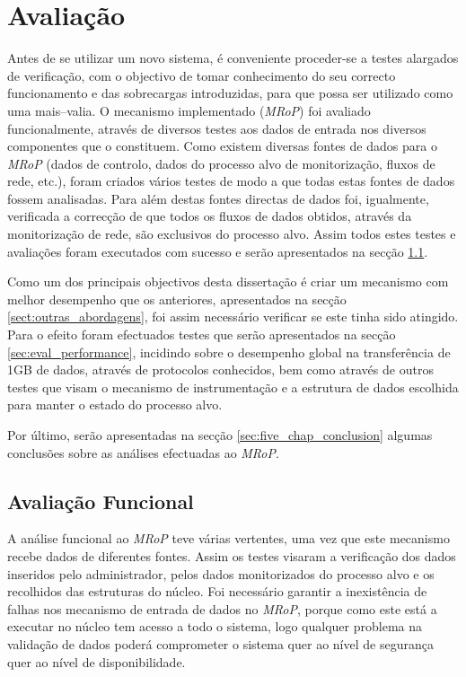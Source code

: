 \chapter{Avaliação}
\label{cap:avaliacao}

Antes de se utilizar um novo sistema, é conveniente proceder-se a testes alargados de verificação, com o objectivo de tomar conhecimento do seu correcto funcionamento e das sobrecargas introduzidas, para que possa ser utilizado como uma mais–valia.
O mecanismo implementado (\textit{MRoP}) foi avaliado funcionalmente, através de diversos testes aos dados de entrada nos diversos componentes que o constituem.
Como existem diversas fontes de dados para o \textit{MRoP} (dados de controlo, dados do processo alvo de monitorização, fluxos de rede, etc.), foram criados vários testes de modo a que todas estas fontes de dados fossem analisadas.
Para além destas fontes directas de dados foi, igualmente, verificada a correcção de que todos os fluxos de dados obtidos, através da monitorização de rede, são exclusivos do processo alvo.
Assim todos estes testes e avaliações foram executados com sucesso e serão apresentados na secção \ref{sec:eval_functional}.

Como um dos principais objectivos desta dissertação é criar um mecanismo com melhor desempenho que os anteriores, apresentados na secção \ref{sect:outras_abordagens}, foi assim necessário verificar se este tinha sido atingido.
Para o efeito foram efectuados testes que serão apresentados na secção \ref{sec:eval_performance}, incidindo sobre o desempenho global na transferência de 1GB de dados, através de protocolos conhecidos, bem como através de outros testes que visam o mecanismo de instrumentação e a estrutura de dados escolhida para manter o estado do processo alvo.

Por último, serão apresentadas na secção \ref{sec:five_chap_conclusion} algumas conclusões sobre as análises efectuadas ao \textit{MRoP}.

\section{Avaliação Funcional}
\label{sec:eval_functional}

A análise funcional ao \textit{MRoP} teve várias vertentes, uma vez que este mecanismo recebe dados de diferentes fontes.
Assim os testes visaram a verificação dos dados inseridos pelo administrador, pelos dados monitorizados do processo alvo e os recolhidos das estruturas do núcleo.
Foi necessário garantir a inexistência de falhas nos mecanismo de entrada de dados no \textit{MRoP}, porque como este está a executar no núcleo tem acesso a todo o sistema, logo qualquer problema na validação de dados poderá comprometer o sistema quer ao nível de segurança quer ao nível de disponibilidade.



